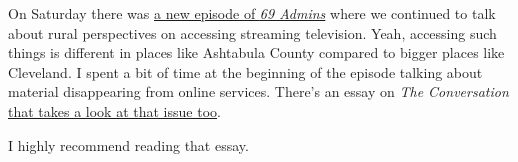 On Saturday there was \href{https://69admins.com/2023/episode-7.html}{a
new episode of \emph{69 Admins}} where we continued to talk about rural
perspectives on accessing streaming television. Yeah, accessing such
things is different in places like Ashtabula County compared to bigger
places like Cleveland. I spent a bit of time at the beginning of the
episode talking about material disappearing from online services.
There's an essay on \emph{The Conversation}
\href{https://theconversation.com/streaming-services-are-removing-original-tv-and-films-what-this-means-for-your-favourite-show-and-our-cultural-heritage-208746}{that
takes a look at that issue too}.

I highly recommend reading that essay.
